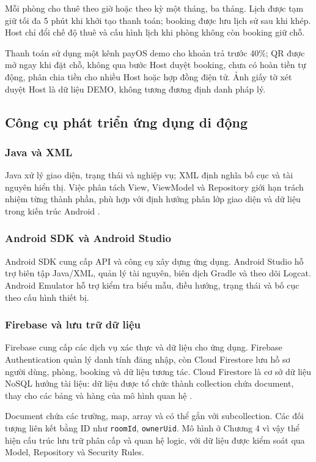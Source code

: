 Mỗi phòng cho thuê theo giờ hoặc theo kỳ một tháng, ba tháng. Lịch được tạm giữ tối đa 5 phút khi khởi tạo thanh toán; booking được lưu lịch sử sau khi khép. Host chỉ đổi chế độ thuê và cấu hình lịch khi phòng không còn booking giữ chỗ.

Thanh toán sử dụng một kênh payOS demo cho khoản trả trước 40\%; QR được mở ngay khi đặt chỗ, không qua bước Host duyệt booking, chưa có hoàn tiền tự động, phân chia tiền cho nhiều Host hoặc hợp đồng điện tử. Ảnh giấy tờ xét duyệt Host là dữ liệu DEMO, không tương đương định danh pháp lý.

\subsection{Công cụ phát triển ứng dụng di động}
\subsubsection{Java và XML}
Java xử lý giao diện, trạng thái và nghiệp vụ; XML định nghĩa bố cục và tài nguyên hiển thị. Việc phân tách View, ViewModel và Repository giới hạn trách nhiệm từng thành phần, phù hợp với định hướng phân lớp giao diện và dữ liệu trong kiến trúc Android \parencite{android_arch}.

\subsubsection{Android SDK và Android Studio}
Android SDK cung cấp API và công cụ xây dựng ứng dụng. Android Studio hỗ trợ biên tập Java/XML, quản lý tài nguyên, biên dịch Gradle và theo dõi Logcat. Android Emulator hỗ trợ kiểm tra biểu mẫu, điều hướng, trạng thái và bố cục theo cấu hình thiết bị.

\subsubsection{Firebase và lưu trữ dữ liệu}
\label{sec:ch1-nosql}
Firebase cung cấp các dịch vụ xác thực và dữ liệu cho ứng dụng. Firebase Authentication quản lý danh tính đăng nhập, còn Cloud Firestore lưu hồ sơ người dùng, phòng, booking và dữ liệu tương tác. Cloud Firestore là cơ sở dữ liệu NoSQL hướng tài liệu: dữ liệu được tổ chức thành collection chứa document, thay cho các bảng và hàng của mô hình quan hệ \parencite{firebase_data_model}.

Document chứa các trường, map, array và có thể gắn với subcollection. Các đối tượng liên kết bằng ID như \texttt{roomId}, \texttt{ownerUid}. Mô hình ở Chương 4 vì vậy thể hiện cấu trúc lưu trữ phân cấp và quan hệ logic, với dữ liệu được kiểm soát qua Model, Repository và Security Rules.

